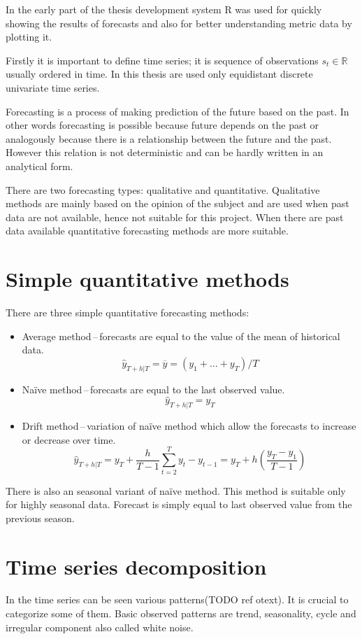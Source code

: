 In the early part of the thesis
development system R was used for quickly showing the results of forecasts and also 
for better understanding metric data by plotting it.

Firstly it is important to define time series; it is sequence of observations
$ s_t \in \mathbb{R} $ usually ordered in time. In this thesis are used only
equidistant discrete univariate time series. 

Forecasting is a process of making prediction of the future based 
on the past. In other words forecasting is possible because  
future depends on the past or analogously because there is a relationship
between the future and the past. However this relation is not deterministic and 
can be hardly written in an analytical form.

There are two forecasting types: qualitative and quantitative.
Qualitative methods are mainly based on the opinion of the subject and are used 
when past data are not available, hence not suitable for this project. 
When there are past data available quantitative forecasting methods are more suitable. 

\section{Simple quantitative methods}
There are three simple quantitative forecasting methods:

\begin{itemize}
    \item Average method\,--\,forecasts are equal to the value of the mean of
        historical data.
        $$ \hat{y}_{T+h|T} = \overline{y} = (y_{1}+ \dots + y_{T}) / T $$
    \item Na\"{i}ve method\,--\,forecasts are equal to the last observed value.
        $$ \hat{y}_{T+h|T} = y_{T} $$ 
    \item Drift method\,--\,variation of na\"{i}ve method which allow the
        forecasts to increase or decrease over time.
        $$ \hat{y}_{T+h|T} = y_{T} + \frac{h}{T-1} \sum_{t=2}^T{y_{t} - y_{t-1}} = 
        y_{T} + h(\frac{y_{T}-y_{1}}{T-1}) $$
\end{itemize}
There is also an seasonal variant of na\"{i}ve method. This method is suitable only
for highly seasonal data. Forecast is simply equal to last observed value from
the previous season.

\section{Time series decomposition}
In the time series can be seen various patterns(TODO ref otext). It is crucial to categorize
some of them. Basic observed patterns are trend, seasonality, cycle and irregular
component also called white noise. 

